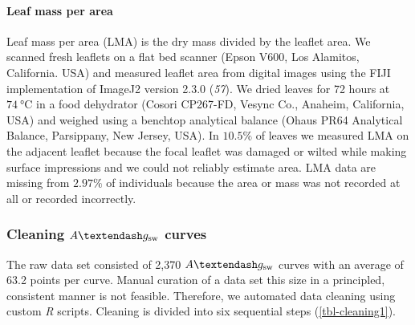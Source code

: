 \documentclass[
  letterpaper,
  DIV=11,
  numbers=noendperiod]{scrartcl}
\let\oldparagraph\paragraph
\renewcommand{\paragraph}[1]{\oldparagraph{#1}\mbox{}}
\newcommand{\agcurve}{$A \textendash g_\text{sw}$}
\begin{document}
\paragraph{Leaf mass per area}\label{leaf-mass-per-area}

Leaf mass per area (LMA) is the dry mass divided by the leaflet area. We
scanned fresh leaflets on a flat bed scanner (Epson V600, Los Alamitos,
California. USA) and measured leaflet area from digital images using the
FIJI implementation of ImageJ2 version 2.3.0 (\emph{57}). We dried
leaves for 72 hours at \(\qty{74}{\degreeCelsius}\) in a food dehydrator
(Cosori CP267-FD, Vesync Co., Anaheim, California, USA) and weighed
using a benchtop analytical balance (Ohaus PR64 Analytical Balance,
Parsippany, New Jersey, USA). In \(10.5\%\) of leaves we measured LMA on
the adjacent leaflet because the focal leaflet was damaged or wilted
while making surface impressions and we could not reliably estimate
area. LMA data are missing from \(2.97\%\) of individuals because the
area or mass was not recorded at all or recorded incorrectly.

\subsubsection{\texorpdfstring{Cleaning \agcurve{}
curves}{Cleaning  curves}}\label{cleaning-curves}

The raw data set consisted of 2,370 \agcurve{} curves with an average of
63.2 points per curve. Manual curation of a data set this size in a
principled, consistent manner is not feasible. Therefore, we automated
data cleaning using custom \emph{R} scripts. Cleaning is divided into
six sequential steps (\autoref{tbl-cleaning1}).
\end{document}
